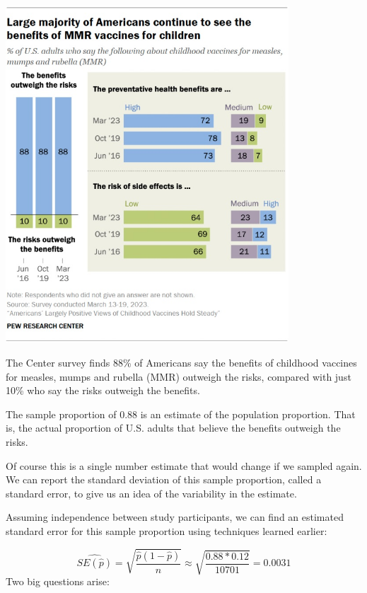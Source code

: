 \documentclass[
]{article}
\begin{document}
\includegraphics[width=400px]{../img/pew}

The Center survey finds 88\% of Americans say the benefits of childhood
vaccines for measles, mumps and rubella (MMR) outweigh the risks,
compared with just 10\% who say the risks outweigh the benefits.

The sample proportion of 0.88 is an estimate of the population
proportion. That is, the actual proportion of U.S. adults that believe
the benefits outweigh the risks.

Of course this is a single number estimate that would change if we
sampled again. We can report the standard deviation of this sample
proportion, called a standard error, to give us an idea of the
variability in the estimate.

Assuming independence between study participants, we can find an
estimated standard error for this sample proportion using techniques
learned earlier:

\[\widehat{SE(\hat{p})} = \sqrt{\frac{\hat{p}(1-\hat{p})}{n}} \approx \sqrt{\frac{0.88*0.12}{10701}} = 0.0031\]
Two big questions arise:
\end{document}
